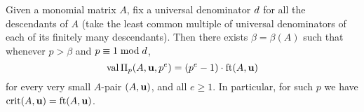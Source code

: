 \documentclass{amsart}
\begin{document}
%
%
%
%
%
%

\begin{corollary}
   Given a monomial matrix $A$, fix a universal denominator $d$ for all the descendants of $A$ \textup(\eg take the least common multiple of universal denominators of each of its finitely many descendants\textup).
   Then there exists $\beta = \beta(A)$ such that whenever $p>\beta$ and $p \equiv 1 \bmod d$,
\[
 \operatorname{val}\Pi_p(A,\mathbf{u},p^e) = (p^e-1) \cdot \operatorname{ft}(A, \mathbf{u})
\]
for every very small $A$-pair $(A, \mathbf{u})$, and all $e \geq 1$.
In particular, for such $p$ we have $\operatorname{crit}(A,\mathbf{u}) = \operatorname{ft}(A, \mathbf{u})$.
\end{corollary}
\end{document}

